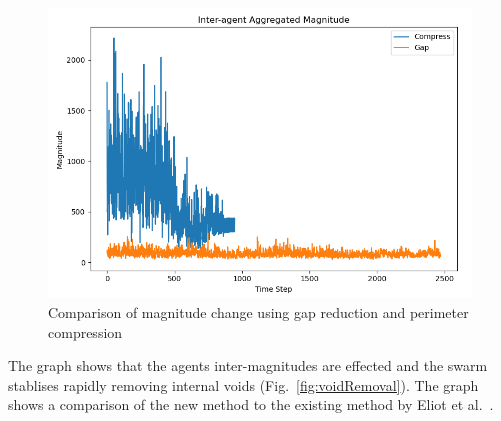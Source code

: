 \documentclass[12pt,a4paper]{IEEEtran}
\begin{document}
\begin{figure}[H]
	\centering
	\includegraphics[width=0.8\linewidth]{figures/CompressionEffect1}
	\caption[Compression Effect]{Comparison of magnitude change using gap reduction and perimeter compression}
	\label{fig:compressioneffect1}
\end{figure}

The graph shows that the agents inter-magnitudes are effected and the swarm stablises rapidly removing internal voids (Fig.~\ref{fig:voidRemoval}). The graph shows a comparison of the new method to the existing method by Eliot et al.~\cite{eliot2019void}.
\end{document}
